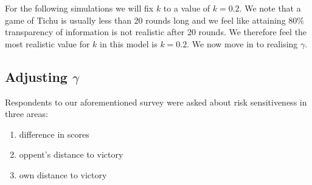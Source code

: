 For the following simulations we will fix $k$ to a value of $k = 0.2$. We note that a game of Tichu is usually less than 20 rounds long and we feel like attaining $80\%$ transparency of information is not realistic after 20 rounds. We therefore feel the most realistic value for $k$ in this model is $k = 0.2$. We now move in to realising $\gamma$.

\subsection{Adjusting $\gamma$}

Respondents to our aforementioned survey were asked about risk sensitiveness in three areas:
\begin{enumerate}[(1)]
\item difference in scores
\item oppent's distance to victory
\item own distance to victory
\end{enumerate}

